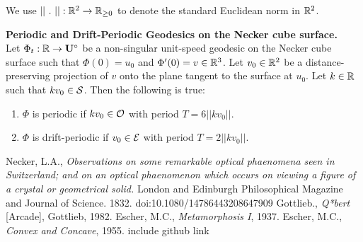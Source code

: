 \documentclass[a4paper, 11pt]{article}
\begin{document}
We use $||~.~||:\mathbb{R}^2\rightarrow\mathbb{R}_{\geq 0}$ to denote the standard Euclidean norm in $\mathbb{R}^2$.

\begin{thm*} \textbf{Periodic and Drift-Periodic Geodesics on the Necker cube surface.} 
\\Let $\Phi_t:\mathbb{R}\rightarrow\mathbf{U}^\circ$ be a non-singular unit-speed geodesic on the Necker cube surface such that $\Phi(0)=u_0$ and $\Phi'(0)=v\in\mathbb{R}^3$. Let $v_0\in\mathbb{R}^2$ be a distance-preserving projection of $v$ onto the plane tangent to the surface at $u_0$. Let $k\in\mathbb{R}$ such that $kv_0\in\mathcal{S}$. Then the following is true:
\begin{enumerate}[label=(\roman*)]
\item $\Phi$ is periodic if $kv_0\in\mathcal{O}$ with period $T=6||kv_0||$.
\item $\Phi$ is drift-periodic if $v_0\in\mathcal{E}$ with period $T=2||kv_0||$.
\end{enumerate}
\end{thm*}
\newpage
\newpage
\begin{thebibliography}{9}
 Necker, L.A., \emph{Observations on some remarkable optical phaenomena seen in Switzerland; and on an optical phaenomenon which occurs on viewing a figure of a crystal or geometrical solid.} London and Edinburgh Philosophical Magazine and Journal of Science. 1832. doi:10.1080/14786443208647909
 Gottlieb., \emph{Q*bert} [Arcade], Gottlieb, 1982.
 Escher, M.C., \emph{Metamorphosis I}, 1937.
 Escher, M.C., \emph{Convex and Concave}, 1955.
 include github link
\end{thebibliography}
\end{document}
